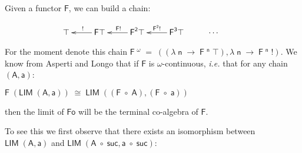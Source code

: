 \documentclass[a4paper]{article}
\newcommand{\Conid}[1]{\mathit{#1}}
\newcommand{\Varid}[1]{\mathit{#1}}
\renewcommand\Varid[1]{\mathord{\textsf{#1}}}
\let\Conid\Varid
\begin{document}
Given a functor \ensuremath{\Conid{F}}, we can build a chain:

\[
\xymatrix{
\ensuremath{\top} &
\ar[l]_{\ensuremath{\mathbin{!}}}
\ensuremath{\Conid{F}} \ensuremath{\top} &
\ar[l]_{\ensuremath{\Conid{F}} \ensuremath{\mathbin{!}}}
\ensuremath{\Conid{F}}^{\ensuremath{\Varid{2}}} \ensuremath{\top} &
\ar[l]_{\ensuremath{\Conid{F}}^{\ensuremath{\Varid{2}}} \ensuremath{\mathbin{!}}}
\ensuremath{\Conid{F}}^{\ensuremath{\Varid{3}}} \ensuremath{\top} &
\cdots &
} 
\]


\noindent
For the moment denote this chain \ensuremath{\Conid{F}\;\!^{\omega}\;\mathrel{=}\;((\lambda\;\Varid{n}\;\rightarrow\;\Conid{F}\;\!^{\Varid{n}}\;\top),\lambda\;\Varid{n}\;\rightarrow\;\Conid{F}\;\!^{\Varid{n}}\;\mathbin{!})}. 
We know from Asperti and Longo \cite{AspertiLongo} that if \ensuremath{\Conid{F}} is 
$\omega$-continuous, \emph{i.e.} that for any chain \ensuremath{(\Conid{A},\Varid{a})}:

\ensuremath{\Conid{F}\;(\Conid{LIM}\;(\Conid{A},\Varid{a}))\;\cong\;\Conid{LIM}\;((\Conid{F}\;\ensuremath{\mbox{$\circ$}}\;\Conid{A}),(\Conid{F}\;\ensuremath{\mbox{$\circ$}}\;\Varid{a}))}

\noindent
then the limit of \ensuremath{\Conid{Fo}} will be the terminal co-algebra of \ensuremath{\Conid{F}}. 

To see this we first observe that there exists an isomorphism between 
\ensuremath{\Conid{LIM}\;(\Conid{A},\Varid{a})} and \ensuremath{\Conid{LIM}\;(\Conid{A}\;\ensuremath{\mbox{$\circ$}}\;\Varid{suc},\Varid{a}\;\ensuremath{\mbox{$\circ$}}\;\Varid{suc})}:
\end{document}

